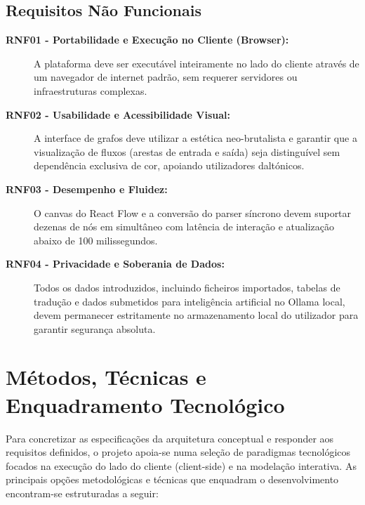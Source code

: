 \subsection{Requisitos Não Funcionais}
\begin{description}
    \item[\textbf{RNF01 - Portabilidade e Execução no Cliente (Browser):}] A plataforma deve ser executável inteiramente no lado do cliente através de um navegador de internet padrão, sem requerer servidores ou infraestruturas complexas.
    \item[\textbf{RNF02 - Usabilidade e Acessibilidade Visual:}] A interface de grafos deve utilizar a estética neo-brutalista e garantir que a visualização de fluxos (arestas de entrada e saída) seja distinguível sem dependência exclusiva de cor, apoiando utilizadores daltónicos.
    \item[\textbf{RNF03 - Desempenho e Fluidez:}] O canvas do React Flow e a conversão do parser síncrono devem suportar dezenas de nós em simultâneo com latência de interação e atualização abaixo de 100 milissegundos.
    \item[\textbf{RNF04 - Privacidade e Soberania de Dados:}] Todos os dados introduzidos, incluindo ficheiros importados, tabelas de tradução e dados submetidos para inteligência artificial no Ollama local, devem permanecer estritamente no armazenamento local do utilizador para garantir segurança absoluta.
\end{description}

\section{Métodos, Técnicas e Enquadramento Tecnológico}
\label{sec:metodos-tecnologia}

Para concretizar as especificações da arquitetura conceptual e responder aos requisitos definidos, o projeto apoia-se numa seleção de paradigmas tecnológicos focados na execução do lado do cliente (client-side) e na modelação interativa. As principais opções metodológicas e técnicas que enquadram o desenvolvimento encontram-se estruturadas a seguir:

